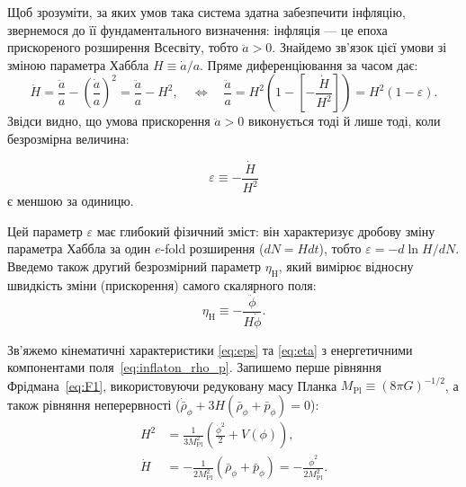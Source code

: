 Щоб зрозуміти, за яких умов така система здатна забезпечити інфляцію, звернемося до її фундаментального визначення: інфляція --- це епоха прискореного розширення Всесвіту, тобто $\ddot{a} > 0$. Знайдемо зв'язок цієї умови зі зміною параметра Хаббла $H \equiv \dot{a}/a$. Пряме диференціювання за часом дає:
\begin{equation*}
  \dot{H} = \frac{\ddot{a}}{a} - \left(\frac{\dot{a}}{a}\right)^2 = \frac{\ddot{a}}{a} - H^2,
  \quad \Leftrightarrow \quad
  \frac{\ddot{a}}{a} = H^2 \left( 1 - \left[-\frac{\dot{H}}{H^2}\right] \right) =  H^2 \left( 1 - \varepsilon \right) .
\end{equation*}
Звідси видно, що умова прискорення $\ddot{a} > 0$ виконується тоді й лише тоді, коли безрозмірна величина:

\begin{equation}\label{eq:eps}
    \varepsilon \equiv -\frac{\dot{H}}{H^2}
\end{equation}
є меншою за одиницю.

Цей параметр $\varepsilon$ має глибокий фізичний зміст: він характеризує дробову зміну параметра Хаббла за один $e$-fold розширення ($dN = H dt$), тобто $\varepsilon = -d\ln H / dN$. Введемо також другий безрозмірний параметр $\eta_{\mathrm{H}}$, який вимірює відносну швидкість зміни (прискорення) самого скалярного поля:
\begin{equation}\label{eq:eta}
  \eta_{\mathrm{H}} \equiv -\frac{\ddot{\phi}}{H\dot{\phi}}.
\end{equation}

Зв'яжемо кінематичні характеристики \eqref{eq:eps} та \eqref{eq:eta} з енергетичними компонентами поля~\eqref{eq:inflaton_rho_p}. Запишемо перше рівняння Фрідмана~\eqref{eq:F1}, використовуючи редуковану масу Планка $M_\mathrm{Pl} \equiv (8\pi G)^{-1/2}$, а також рівняння неперервності ($\dot{\bar{\rho}}_\phi + 3H(\bar{\rho}_\phi + \bar{p}_\phi) = 0$):
\begin{align}
  H^2 &= \frac{1}{3M_\mathrm{Pl}^2} \left(\frac{\dot\phi^2}{2} + V(\phi)\right), \label{eq:friedmann_inflaton} \\
  \dot{H} &= -\frac{1}{2M_\mathrm{Pl}^2}(\bar{\rho}_\phi + \bar{p}_\phi) = -\frac{\dot{\phi}^2}{2M_\mathrm{Pl}^2}. \label{eq:hdot_inflaton}
\end{align}

